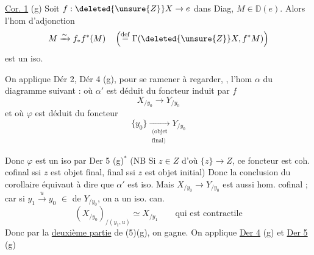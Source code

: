 
\uline{Cor. 1} (g) Soit $f:\deleted{\unsure{Z}}X\to e$ dans Diag,  $M\in\mathbb D(e)$. Alors l'hom d'adjonction
\[
 M\xrightarrow{\sim}f_*f^*(M)\quad\left(\overset{\mathrm{def}}{=}\Gamma(\deleted{\unsure{Z}}X,f^*M)\right)
\]
est un iso.

On applique Dér 2, Dér 4 (g), pour se ramener à regarder, , l'hom $\alpha$ du diagramme  suivant :
où $\alpha'$ est déduit du foncteur induit par $f$
\[
 X_{/y_0}\longrightarrow Y_{/y_0}
\]
et où $\varphi$ est déduit du foncteur
\[
 \{y_0\}\xrightarrow[\substack{(\text{objet}\\ \text{final})}]{} Y_{/y_0}
\]

Donc $\varphi$ est un iso par Der 5 (g)$^*$ (NB Si $z\in Z$ d'où $\{z\}\to Z$, ce foncteur est coh. cofinal ssi $z$ est objet final,   final ssi $z$ est objet initial) Donc la conclusion du corollaire équivaut à dire que $\alpha'$ est iso. Mais $X_{/y_0}\to Y_{/y_0}$ est aussi hom. cofinal \deleted{\unsure{\(\longrightarrow\)}} ; car si $y_1\xrightarrow{u}y_0$  $\in$ de $Y_{/y_0}$, on a un iso. can.
\[
 (X_{/y_0})_{/(y_1,u)}\simeq X_{/y_1}\qquad\text{qui est contractile}
\]
Donc par la \uline{deuxième partie} de  (5)(g), on gagne.
On applique \uline{Der 4} (g) et \uline{Der 5} (g)

